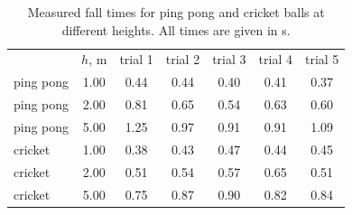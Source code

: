 \begin{table}
  \caption{Measured fall times for ping pong and cricket balls at different heights. All times are given in \unit{\second}.}
  \label{tab:1}
  \begin{ruledtabular}
    \begin{tabular}{lcccccc}
      & $h$, \unit{\meter} & trial 1 & trial 2 & trial 3 & trial 4 & trial 5 \\
      \colrule
      ping pong & \num{1.00} & \num{0.44} & \num{0.44} & \num{0.40} & \num{0.41} & \num{0.37} \\
      ping pong & \num{2.00} & \num{0.81} & \num{0.65} & \num{0.54} & \num{0.63} & \num{0.60} \\
      ping pong & \num{5.00} & \num{1.25} & \num{0.97} & \num{0.91} & \num{0.91} & \num{1.09} \\
      cricket   & \num{1.00} & \num{0.38} & \num{0.43} & \num{0.47} & \num{0.44} & \num{0.45} \\
      cricket   & \num{2.00} & \num{0.51} & \num{0.54} & \num{0.57} & \num{0.65} & \num{0.51} \\
      cricket   & \num{5.00} & \num{0.75} & \num{0.87} & \num{0.90} & \num{0.82} & \num{0.84} 
    \end{tabular}
  \end{ruledtabular}
\end{table}
